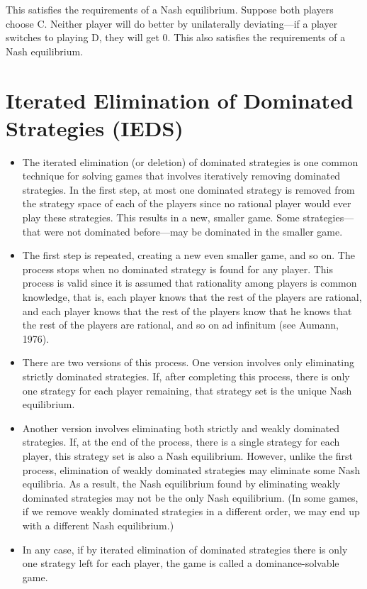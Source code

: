 \documentclass[]{report}
\begin{document}
This satisfies the requirements of a Nash equilibrium. Suppose both players choose C. Neither player will do better by unilaterally deviating—if a player switches to playing D, they will get 0. This also satisfies the requirements of a Nash equilibrium.
\section{Iterated Elimination of Dominated Strategies (IEDS) }
\begin{itemize}
\item The iterated elimination (or deletion) of dominated strategies is one common technique for solving games that involves iteratively removing dominated strategies. In the first step, at most one dominated strategy is removed from the strategy space of each of the players since no rational player would ever play these strategies. This results in a new, smaller game. Some strategies—that were not dominated before—may be dominated in the smaller game. 
\item 
The first step is repeated, creating a new even smaller game, and so on. The process stops when no dominated strategy is found for any player. This process is valid since it is assumed that rationality among players is common knowledge, that is, each player knows that the rest of the players are rational, and each player knows that the rest of the players know that he knows that the rest of the players are rational, and so on ad infinitum (see Aumann, 1976).
\item 
There are two versions of this process. One version involves only eliminating strictly dominated strategies. If, after completing this process, there is only one strategy for each player remaining, that strategy set is the unique Nash equilibrium.
\item
Another version involves eliminating both strictly and weakly dominated strategies. If, at the end of the process, there is a single strategy for each player, this strategy set is also a Nash equilibrium. However, unlike the first process, elimination of weakly dominated strategies may eliminate some Nash equilibria. As a result, the Nash equilibrium found by eliminating weakly dominated strategies may not be the only Nash equilibrium. (In some games, if we remove weakly dominated strategies in a different order, we may end up with a different Nash equilibrium.)
\item 
In any case, if by iterated elimination of dominated strategies there is only one strategy left for each player, the game is called a dominance-solvable game.
\end{itemize}
\newpage
\end{document}
